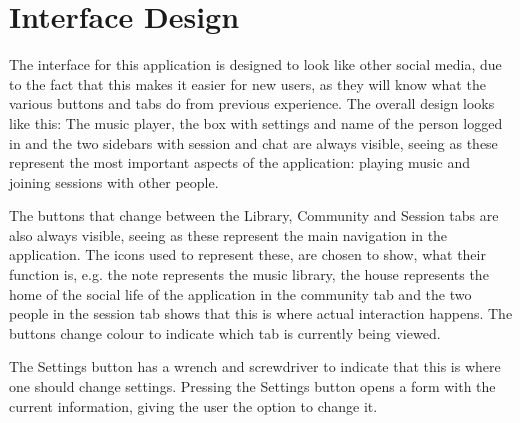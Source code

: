 \section{Interface Design}
The interface for this application is designed to look like other social media, due to the fact that this makes it easier for
 new users, as they will know what the various buttons and tabs do from previous experience. The overall design looks like this:
\clearpage
\noindent{}
The music player, the box with settings and name of the person logged in and the two sidebars with session and chat are always
visible, seeing as these represent the most important aspects of the application: playing music and joining sessions with
other people. 

\vspace{10pt}
The buttons that change between the Library, Community and Session tabs are also always visible, seeing as
these represent the main navigation in the application. The icons used to represent these, are chosen to show, what their
function is, e.g. the note represents the music library, the house represents the home of the social life of the application in the
community tab and the two people in the session tab shows that this is where actual interaction happens. The buttons change
colour to indicate which tab is currently being viewed. 

\vspace{10pt}
The Settings button has a wrench and screwdriver to indicate that this
is where one should change settings. Pressing the Settings button opens a form with the current information, giving the user the option to change it.

